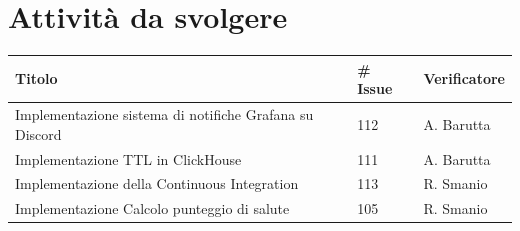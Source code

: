 \documentclass{article}
\begin{document}
    \section{Attività da svolgere}
    \begin{center}
        \begin{tabular}{|C{7cm}|C{1,5cm}|C{3cm}|}
            \hline
            \textbf{Titolo} & \textbf{\# Issue} & \textbf{Verificatore} \\
            \hline
            \hline
            Implementazione sistema di notifiche Grafana su Discord & 112 & A. Barutta \\
            \hline
            Implementazione TTL in ClickHouse & 111 & A. Barutta \\
            \hline
            Implementazione della Continuous Integration & 113 & R. Smanio \\
            \hline
            Implementazione Calcolo punteggio di salute & 105 & R. Smanio\\
            \hline
        \end{tabular}
    \end{center}
\end{document}
